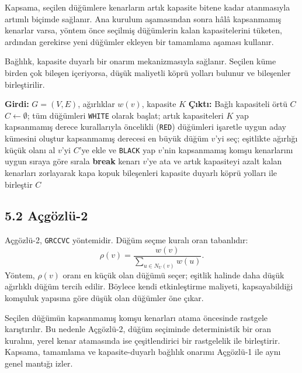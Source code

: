 \documentclass[11pt]{article}
\begin{document}
Kapsama, seçilen düğümlere kenarların artık kapasite bitene kadar atanmasıyla artımlı biçimde sağlanır. Ana kurulum aşamasından sonra hâlâ kapsanmamış kenarlar varsa, yöntem önce seçilmiş düğümlerin kalan kapasitelerini tüketen, ardından gerekirse yeni düğümler ekleyen bir tamamlama aşaması kullanır.

Bağlılık, kapasite duyarlı bir onarım mekanizmasıyla sağlanır. Seçilen küme birden çok bileşen içeriyorsa, düşük maliyetli köprü yolları bulunur ve bileşenler birleştirilir.

\begin{algorithm}[h]
\caption{Açgözlü-1 / GCCVC}
\begin{algorithmic}[1]
\State \textbf{Girdi:} \(G=(V,E)\), ağırlıklar \(w(v)\), kapasite \(K\)
\State \textbf{Çıktı:} Bağlı kapasiteli örtü \(C\)
\State \(C\gets\emptyset\); tüm düğümleri \texttt{WHITE} olarak başlat; artık kapasiteleri \(K\) yap
    \State kapsanmamış derece kurallarıyla öncelikli (\texttt{RED}) düğümleri işaretle
    \State uygun aday kümesini oluştur
    \State kapsanmamış derecesi en büyük düğüm \(v\)'yi seç; eşitlikte ağırlığı küçük olanı al
    \State \(v\)'yi \(C\)'ye ekle ve \texttt{BLACK} yap
    \State \(v\)'nin kapsanmamış komşu kenarlarını uygun sıraya göre sırala
            \State \textbf{break}
        \EndIf
        \State kenarı \(v\)'ye ata ve artık kapasiteyi azalt
    \EndFor
\EndWhile
{}
    \State kalan kenarları zorlayarak kapa
\EndIf
\State kopuk bileşenleri kapasite duyarlı köprü yolları ile birleştir
\State \Return \(C\)
\end{algorithmic}
\end{algorithm}

\subsection*{5.2 Açgözlü-2}

Açgözlü-2, \texttt{GRCCVC} yöntemidir. Düğüm seçme kuralı oran tabanlıdır:
\[
\rho(v)=\frac{w(v)}{\sum_{u\in N_U(v)} w(u)}.
\]
Yöntem, \(\rho(v)\) oranı en küçük olan düğümü seçer; eşitlik halinde daha düşük ağırlıklı düğüm tercih edilir. Böylece kendi etkinleştirme maliyeti, kapsayabildiği komşuluk yapısına göre düşük olan düğümler öne çıkar.

Seçilen düğümün kapsanmamış komşu kenarları atama öncesinde rastgele karıştırılır. Bu nedenle Açgözlü-2, düğüm seçiminde deterministik bir oran kuralını, yerel kenar atamasında ise çeşitlendirici bir rastgelelik ile birleştirir. Kapsama, tamamlama ve kapasite-duyarlı bağlılık onarımı Açgözlü-1 ile aynı genel mantığı izler.
\end{document}
